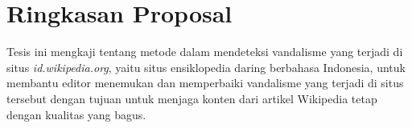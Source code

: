 \section{Ringkasan Proposal}\label{sec:ringkasan}

Tesis ini mengkaji tentang metode dalam mendeteksi vandalisme yang terjadi di situs \textit{id.wikipedia.org}, yaitu situs ensiklopedia daring berbahasa Indonesia, untuk membantu editor menemukan dan memperbaiki vandalisme yang terjadi di situs tersebut dengan tujuan untuk menjaga konten dari artikel Wikipedia tetap dengan kualitas yang bagus.